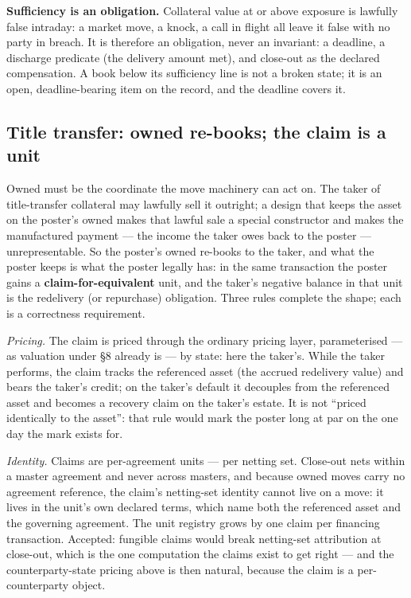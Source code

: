 \documentclass[11pt,a4paper]{article}
\begin{document}
\textbf{Sufficiency is an obligation.} Collateral value at or above exposure
is lawfully false intraday: a market move, a knock, a call in flight all leave
it false with no party in breach. It is therefore an obligation, never an
invariant: a deadline, a discharge predicate (the delivery amount met), and
close-out as the declared compensation. A book below its sufficiency line is
not a broken state; it is an open, deadline-bearing item on the record, and
the deadline covers it.

\subsection{Title transfer: owned re-books; the claim is a unit}

Owned must be the coordinate the move machinery can act on. The taker of
title-transfer collateral may lawfully sell it outright; a design that keeps
the asset on the poster's owned makes that lawful sale a special constructor
and makes the manufactured payment --- the income the taker owes back to the
poster --- unrepresentable. So the poster's owned re-books to the taker, and
what the poster keeps is what the poster legally has: in the same transaction
the poster gains a \textbf{claim-for-equivalent} unit, and the taker's
negative balance in that unit is the redelivery (or repurchase) obligation.
Three rules complete the shape; each is a correctness requirement.

\emph{Pricing.} The claim is priced through the ordinary pricing layer,
parameterised --- as valuation under \S8 already is --- by state: here the
taker's. While the taker performs, the claim tracks the referenced asset (the
accrued redelivery value) and bears the taker's credit; on the taker's default
it decouples from the referenced asset and becomes a recovery claim on the
taker's estate. It is not ``priced identically to the asset'': that rule would
mark the poster long at par on the one day the mark exists for.

\emph{Identity.} Claims are per-agreement units --- per netting set. Close-out
nets within a master agreement and never across masters, and because owned
moves carry no agreement reference, the claim's netting-set identity cannot
live on a move: it lives in the unit's own declared terms, which name both the
referenced asset and the governing agreement. The unit registry grows by one
claim per financing transaction. Accepted: fungible claims would break
netting-set attribution at close-out, which is the one computation the claims
exist to get right --- and the counterparty-state pricing above is then
natural, because the claim is a per-counterparty object.
\end{document}
